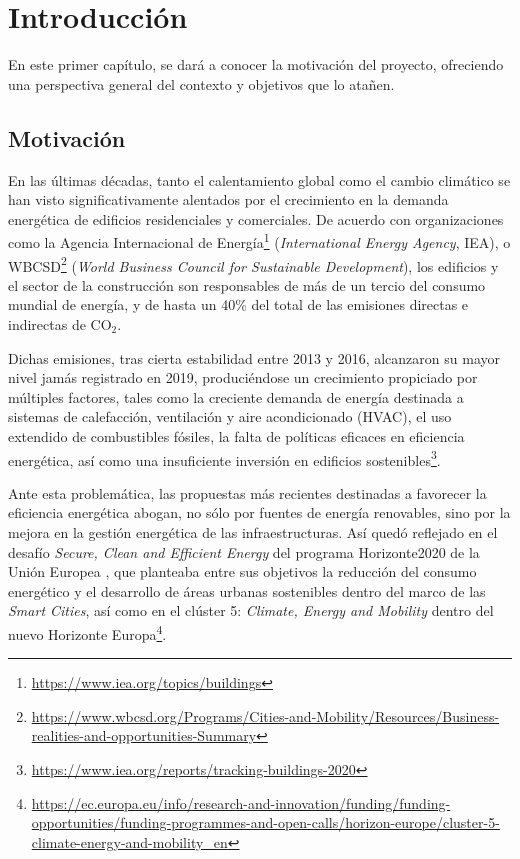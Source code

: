\chapter{Introducción}
\label{ch:1}

En este primer capítulo, se dará a conocer la motivación del proyecto, ofreciendo una perspectiva general del contexto y objetivos que lo atañen.

\section{Motivación}

En las últimas décadas, tanto el calentamiento global como el cambio climático se han visto  significativamente alentados por el crecimiento en la demanda energética de edificios residenciales y comerciales. De acuerdo con organizaciones como la Agencia Internacional de Energía\footnote{\url{https://www.iea.org/topics/buildings}} (\textit{International Energy Agency}, IEA), o WBCSD\footnote{\url{https://www.wbcsd.org/Programs/Cities-and-Mobility/Resources/Business-realities-and-opportunities-Summary}} (\textit{World Business Council for Sustainable Development}), los edificios y el sector de la construcción son responsables de más de un tercio del consumo mundial de energía, y de hasta un 40\% del total de las emisiones directas e indirectas de CO$_2$. 

Dichas emisiones, tras cierta estabilidad entre 2013 y 2016, alcanzaron su mayor nivel jamás registrado en 2019, produciéndose un crecimiento propiciado por múltiples factores, tales como la creciente demanda de energía destinada a sistemas de calefacción, ventilación y aire acondicionado (HVAC), el uso extendido de combustibles fósiles, la falta de políticas eficaces en eficiencia energética, así como una insuficiente inversión en edificios sostenibles\footnote{\url{https://www.iea.org/reports/tracking-buildings-2020}}.

Ante esta problemática, las propuestas más recientes destinadas a favorecer la eficiencia energética abogan, no sólo por fuentes de energía renovables, sino por la mejora en la gestión energética de las infraestructuras. Así quedó reflejado en el desafío \textit{Secure, Clean and Efficient Energy} del programa Horizonte2020 de la Unión Europea \cite{brenneche2012secure}, que planteaba entre sus objetivos la reducción del consumo energético y el desarrollo de áreas urbanas sostenibles dentro del marco de las \textit{Smart Cities}, así como en el clúster 5: \textit{Climate, Energy and Mobility} dentro del nuevo Horizonte Europa\footnote{\url{https://ec.europa.eu/info/research-and-innovation/funding/funding-opportunities/funding-programmes-and-open-calls/horizon-europe/cluster-5-climate-energy-and-mobility_en}}.

